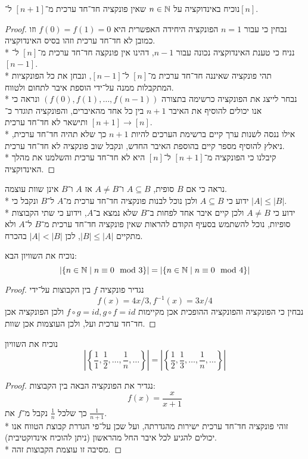 \Question{}
\Subquestion{}
נוכיח באינדוקציה על $n \in \mathbb{N}$ שאין פונקציה חד־חד ערכית מ־$[n + 1]$ ל־$[n]$.
\begin{proof}
	נבחין כי עבור $n = 1$ הפונקציה היחידה האפשרית היא $f(0) = f(1) = 0$ וזו כמובן לא חד־חד ערכית וזהו בסיס האינדוקציה. \\*
	נניח כי טענת האינדוקציה נכונה עבור $n - 1$, דהינו אין פונקצה חד־חד ערכית מ־$[n]$ ל־$[n - 1]$. \\*
	תהי פונקציה שאיננה חד־חד ערכית מ־$[n]$ ל־$[n - 1]$, ונבחן את כל הפונקציות המתקבלות ממנה על־ידי הוספת איבר לתחום ולטווח. \\*
	נבחר לייצג את הפונקציה כרשימה בתצורה $( f(0), f(1), \hdots, f(n - 1))$ ונראה כי אנו יכולים להוסיף את האיבר $n + 1$ בין כל אחד מהאיברים, והפונקציה תוגדר כ־$[n + 1] \to [n]$ ותישאר לא חד־חד ערכית. \\*
	אילו ננסה לשנות ערך קיים ברשימת הערכים להיות $n + 1$ כך שלא תהיה חד־חד ערכית, ניאלץ להוסיף מספר קיים בהוספת האיבר החדש, ונקבל שוב פונקציה לא חד־חד ערכית. \\*
	קיבלנו כי הפונקציה מ־$[n + 1]$ ל־$[n]$ היא לא חד־חד ערכית והשלמנו את מהלך האינדוקציה.
\end{proof}

\Subquestion{}
נראה כי אם $B$ סופית, $A \subseteq B$ ו־$A \ne B$ אז $A$ ו־$B$ אינן שוות עוצמה. \\*
ידוע כי $A \subseteq B$ ולכן נוכל לבנות פונקציה חד־חד ערכית מ־$A$ ל־$B$ ונקבל כי $|A| \le |B|$. \\*
ידוע כי $A \ne B$ ולכן קיים איבר אחד לפחות ב־$B$ שלא נמצא ב־$A$, וידוע כי שתי הקבוצות סופיות, נוכל להשתמש בסעיף הקודם להראות שאין פונקציה חד־חד ערכית מ־$B$ ל־$A$ ולא מתקיים $|B| \le |A|$,
לכן $|A| < |B|$ בהכרח.

\Question{}
\Subquestion{}
נוכיח את השוויון הבא:
\[
	|\{n \in \mathbb{N} \mid n \equiv 0 \mod 3\}| = |\{n \in \mathbb{N} \mid n \equiv 0 \mod 4\} |
\]
\begin{proof}
	נגדיר פונקציה $f$ בין הקבוצות על־ידי
	\[
		f(x) = 4x / 3, f^{-1}(x) = 3x / 4
	\]
	נבחין כי הפונקציה והפונקציה ההופכית אכן מקיימות $f \circ g = id, g \circ f = id$ ולכן הפונקציה אכן חד־חד ערכית ועל, ולכן העוצמות אכן שוות.
\end{proof}

\Subquestion{}
נוכיח את השוויון
\[
	\left\lvert \left\{ \frac{1}{1}, \frac{1}{2}, \hdots, \frac{1}{n}, \hdots \right\}\right\rvert
	= \left\lvert \left\{ \frac{1}{2}, \frac{1}{3}, \hdots, \frac{1}{n}, \hdots \right\}\right\rvert
\]
\begin{proof}
	נגדיר את הפונקציה הבאה בין הקבוצות:
	\[
		f(x) = \frac{x}{x + 1}
	\]
	כך שלכל $\frac{1}{n}$ נקבל מ־$f$ את $\frac{1}{n + 1}$. \\*
	זוהי פונקציה חד־חד ערכית ישירות מהגדרתה, ועל שכן על־פי הגדרת קבוצת הטווח אנו יכולים להגיע לכל איבר החל מהראשון (ניתן להוכיח אינדוקטיבית). \\*
	מסיבה זו עוצמת הקבוצות זהה.
\end{proof}

